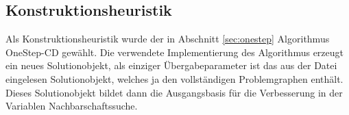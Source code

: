 \begin{comment}
\singlespacing
\begin{lstlisting}[caption={Die Methode \texttt{fromPcpStream}, welche eine Datei im \texttt{.pcp}-Format einließt und in ein Solutionobjekt umwandelt},label={lst:frompcp}]
Solution* Solution::fromPcpStream(istream& in) {
   Solution *s = new Solution();
   
   int vertices, edges, partitions;
   cin >> vertices >> edges >> partitions;
   
   if (DEBUG_LEVEL > 3) {
      cout << "Reading " << vertices << " vertices, " << edges;
      cout << " edges and " << partitions << " partitons ..." << endl;
   }
   
   // Initialize the solution to the read parameters
   s->partition = new int[partitions];
   s->representatives = new int[partitions];
   s->partNodes = new vector<Vertex>[partitions];
   s->numParts = partitions;
   s->colorsUsed = partitions;
   
   #ifdef ubigraph
   s->prepareUbigraph();
   #endif

   // Read partition info and store it into the property map, do the 
   // same for the "original" vertexID, so they can be compared on 
   // all graph
   int i, part;
   for (i = 0; i < vertices; i++) {
      cin >> part;
      s->addVertex(part, i);
      
      if (DEBUG_LEVEL > 3)
         cout << "Added vertex " << i << " to partition " << part << "." << endl;
   }

   // Read the input for edges between to vertices and add them to 
   // the solution graph
   for (i = 0; i < edges; i++) {
      int source, target;
      cin >> source >> target;

      if (DEBUG_LEVEL > 3) {
         cout << "Added edge (" << source << "|" << target << ")" << endl;
      }
      s->addEdge(source, target);
   }
   
   if (DEBUG_LEVEL > 3)
      cout << "Parsing input finished successfully!" << endl;

   return s;
}
\end{lstlisting}
\setstretch{1.5}
\end{comment}



\subsection{Konstruktionsheuristik}
Als Konstruktionsheuristik wurde der in Abschnitt \ref{sec:onestep} Algorithmus OneStep-CD gewählt. Die verwendete Implementierung des Algorithmus
erzeugt ein neues Solutionobjekt, als einziger Übergabeparameter ist das aus der Datei eingelesen Solutionobjekt, welches ja den vollständigen Problemgraphen
enthält. Dieses Solutionobjekt bildet dann die Ausgangsbasis für die Verbesserung in der Variablen Nachbarschaftssuche. 

